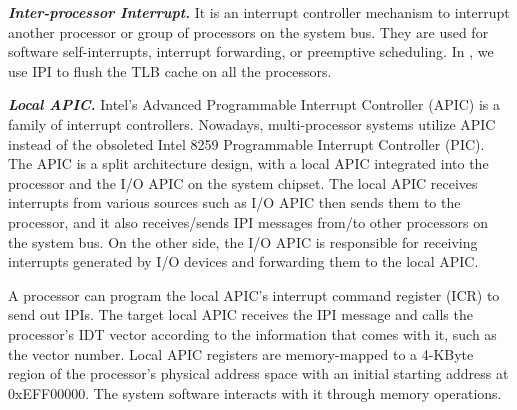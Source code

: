 %
%
%




\textbf{\textit{Inter-processor Interrupt.}}  It is an interrupt controller mechanism to interrupt another processor or group of processors on the system bus. They are used for software self-interrupts, interrupt forwarding, or preemptive scheduling. In \name, we use IPI to flush the TLB cache on all the processors.


\textbf{\textit{Local APIC.}} Intel's Advanced Programmable Interrupt Controller (APIC) is a family of interrupt controllers. Nowadays, multi-processor systems utilize APIC instead of the obsoleted Intel 8259 Programmable Interrupt Controller (PIC). The APIC is a split architecture design, with a local APIC integrated into the processor and the I/O APIC on the system chipset. The local APIC receives interrupts from various sources such as I/O APIC then sends them to the processor, and it also receives/sends IPI messages from/to other processors on the system bus. On the other side, the I/O APIC is responsible for receiving interrupts generated by I/O devices and forwarding them to the local APIC.

A processor can program the local APIC's interrupt command register (ICR) to send out IPIs. The target local APIC receives the IPI message and calls the processor's IDT vector according to the information that comes with it, such as the vector number. Local APIC registers are memory-mapped to a 4-KByte region of the processor's physical address space with an initial starting address at 0xEFF00000. The system software interacts with it through memory operations.



%
%
%

